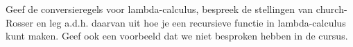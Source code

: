 \begin{question}
	Geef de conversieregels voor lambda-calculus, bespreek de stellingen van church-Rosser en leg a.d.h. daarvan uit hoe je een recursieve functie in lambda-calculus kunt maken. Geef ook een voorbeeld dat we niet besproken hebben in de cursus.
\end{question}

\lipsum[1-3]